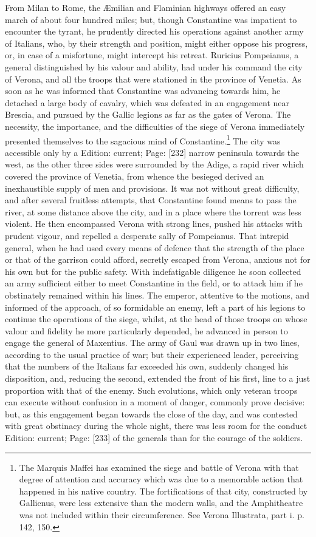 From Milan to Rome, the Æmilian and Flaminian highways offered an easy march of about four hundred miles; but, though Constantine was impatient to encounter the tyrant, he prudently directed his operations against another army of Italians, who, by their strength and position, might either oppose his progress, or, in case of a misfortune, might intercept his retreat. Ruricius Pompeianus, a general distinguished by his valour and ability, had under his command the city of Verona, and all the troops that were stationed in the province of Venetia. As soon as he was informed that Constantine was advancing towards him, he detached a large body of cavalry, which was defeated in an engagement near Brescia, and pursued by the Gallic legions as far as the gates of Verona. The necessity, the importance, and the difficulties of the siege of Verona immediately presented themselves to the sagacious mind of Constantine.\footnote{The Marquis Maffei has examined the siege and battle of Verona with that degree of attention and accuracy which was due to a memorable action that happened in his native country. The fortifications of that city, constructed by Gallienus, were less extensive than the modern walls, and the Amphitheatre was not included within their circumference. See Verona Illustrata, part i. p. 142, 150.} The city was accessible only by a Edition: current; Page: [232] narrow peninsula towards the west, as the other three sides were surrounded by the Adige, a rapid river which covered the province of Venetia, from whence the besieged derived an inexhaustible supply of men and provisions. It was not without great difficulty, and after several fruitless attempts, that Constantine found means to pass the river, at some distance above the city, and in a place where the torrent was less violent. He then encompassed Verona with strong lines, pushed his attacks with prudent vigour, and repelled a desperate sally of Pompeianus. That intrepid general, when he had used every means of defence that the strength of the place or that of the garrison could afford, secretly escaped from Verona, anxious not for his own but for the public safety. With indefatigable diligence he soon collected an army sufficient either to meet Constantine in the field, or to attack him if he obstinately remained within his lines. The emperor, attentive to the motions, and informed of the approach, of so formidable an enemy, left a part of his legions to continue the operations of the siege, whilst, at the head of those troops on whose valour and fidelity he more particularly depended, he advanced in person to engage the general of Maxentius. The army of Gaul was drawn up in two lines, according to the usual practice of war; but their experienced leader, perceiving that the numbers of the Italians far exceeded his own, suddenly changed his disposition, and, reducing the second, extended the front of his first, line to a just proportion with that of the enemy. Such evolutions, which only veteran troops can execute without confusion in a moment of danger, commonly prove decisive: but, as this engagement began towards the close of the day, and was contested with great obstinacy during the whole night, there was less room for the conduct Edition: current; Page: [233] of the generals than for the courage of the soldiers. 
